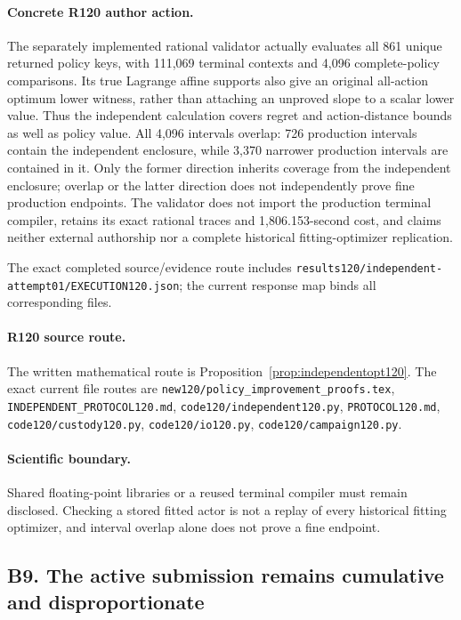 \paragraph{Concrete R120 author action.}
The separately implemented rational validator actually evaluates all 861 unique returned policy keys, with 111,069 terminal contexts and 4,096 complete-policy comparisons. Its true Lagrange affine supports also give an original all-action optimum lower witness, rather than attaching an unproved slope to a scalar lower value. Thus the independent calculation covers regret and action-distance bounds as well as policy value. All 4,096 intervals overlap: 726 production intervals contain the independent enclosure, while 3,370 narrower production intervals are contained in it. Only the former direction inherits coverage from the independent enclosure; overlap or the latter direction does not independently prove fine production endpoints. The validator does not import the production terminal compiler, retains its exact rational traces and 1,806.153-second cost, and claims neither external authorship nor a complete historical fitting-optimizer replication.

The exact completed source/evidence route includes \nolinkurl{results120/independent-attempt01/EXECUTION120.json}; the current response map binds all corresponding files.
\paragraph{R120 source route.}
The written mathematical route is Proposition~\ref{prop:independentopt120}. The exact current file routes are \nolinkurl{new120/policy_improvement_proofs.tex}, \nolinkurl{INDEPENDENT_PROTOCOL120.md}, \nolinkurl{code120/independent120.py}, \nolinkurl{PROTOCOL120.md}, \nolinkurl{code120/custody120.py}, \nolinkurl{code120/io120.py}, \nolinkurl{code120/campaign120.py}.
\paragraph{Scientific boundary.}
Shared floating-point libraries or a reused terminal compiler must remain disclosed. Checking a stored fitted actor is not a replay of every historical fitting optimizer, and interval overlap alone does not prove a fine endpoint.

\subsection{B9. The active submission remains cumulative and disproportionate}
\label{response120:B9}
